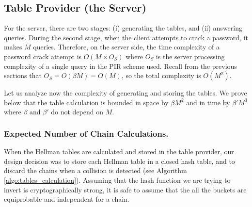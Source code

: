 \documentclass{llncs}
\begin{document}
\subsection{Table Provider (the Server)}

For the server, there are two stages: (i) generating the tables, and
(ii) answering queries.
During the second stage, when the client attempts to crack a password, 
it makes $M$ queries.
Therefore, on the server side, the time complexity of a password crack attempt 
is $O(M \times O_{S})$
where $O_{S}$ is the server processing complexity of a single query in
the PIR scheme used. Recall from the previous sections
that $O_{S} = O(\beta M) = O(M)$, so the total complexity is $O(M^2)$.

Let us analyze now the complexity of generating and storing the tables.
We prove below that the table calculation is bounded in space by $\beta M^{2}$ 
and in time by $\beta'M^{3}$ where $\beta$ and $\beta'$ do not depend on
$M$. 


\subsubsection{Expected Number of Chain Calculations.
\label{sub:number-of-chains-calculation}}

When the Hellman tables are calculated and stored in the table provider,
our design decision was to store each Hellman table in a closed hash table,
and to discard the chains when a collision is detected
(see Algorithm \ref{algo:tables_calculation}).
Assuming that the hash function we are trying to invert is cryptographically
strong, it is safe to assume that the all the buckets are equiprobable
and independent for a chain.
\end{document}
